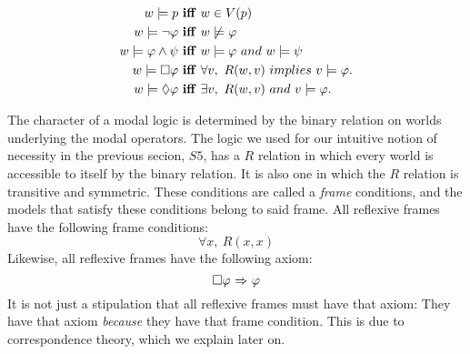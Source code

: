 \begin{align*}
w \models p\  &\mathbf{iff}\ w \in V(p) \\
w \models \neg \varphi\  &\mathbf{iff}\  w\not\models \varphi  \\
w \models \varphi \wedge \psi\ &\mathbf{iff}\ w\models \varphi\ \mathnormal{and}\ w\models \psi \\
w \models \Box \varphi\  &\mathbf{iff}\ \forall v,\ R(w,v)\  \mathnormal{implies}\ v \models \varphi. \\
w \models \Diamond \varphi\ &\mathbf{iff}\ \exists v,\ R(w,v)\ \mathnormal{and}\ v\models \varphi.
\end{align*}

The character of a modal logic is determined by the binary relation on worlds underlying the modal operators. The logic we used for our intuitive notion of necessity in the previous secion, $\mathit{S5}$, has a $R$ relation in which every world is accessible to itself by the binary relation. It is also one in which the $R$ relation is transitive and symmetric. These conditions are called a \emph{frame} conditions, and the models that satisfy these conditions belong to said frame. All reflexive frames have the following frame conditions:
\begin{equation}
\forall x,\ R(x,x)
\end{equation}
Likewise, all reflexive frames have the following axiom:
\begin{equation}
	\Box \varphi {\ \Rightarrow \ } \varphi
\end{equation}
It is not just a stipulation that all reflexive frames must have that axiom: They have that axiom \emph{because} they have that frame condition. This is due to correspondence theory, which we explain later on.

